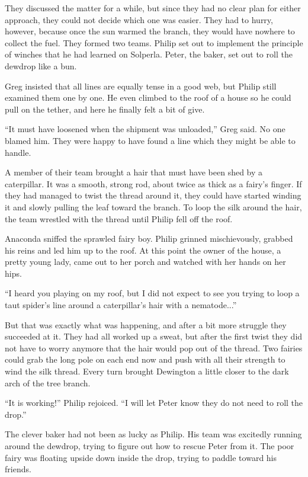 \documentclass[10pt, draft]{memoir}
\begin{document}
They discussed the matter for a while, but since they had no clear plan for either approach, they could not decide which one was easier. They had to hurry, however, because once the sun warmed the branch, they would have nowhere to collect the fuel. They formed two teams. Philip set out to implement the principle of winches that he had learned on Solperla. Peter, the baker, set out to roll the dewdrop like a bun.

Greg insisted that all lines are equally tense in a good web, but Philip still examined them one by one. He even climbed to the roof of a house so he could pull on the tether, and here he finally felt a bit of give.

``It must have loosened when the shipment was unloaded,'' Greg said. No one blamed him. They were happy to have found a line which they might be able to handle.

A member of their team brought a hair that must have been shed by a caterpillar. It was a smooth, strong rod, about twice as thick as a fairy's finger. If they had managed to twist the thread around it, they could have started winding it and slowly pulling the leaf toward the branch. To loop the silk around the hair, the team wrestled with the thread until Philip fell off the roof.

Anaconda sniffed the sprawled fairy boy. Philip grinned mischievously, grabbed his reins and led him up to the roof. At this point the owner of the house, a pretty young lady, came out to her porch and watched with her hands on her hips.

``I heard you playing on my roof, but I did not expect to see you trying to loop a taut spider's line around a caterpillar's hair with a nematode...''

But that was exactly what was happening, and after a bit more struggle they succeeded at it. They had all worked up a sweat, but after the first twist they did not have to worry anymore that the hair would pop out of the thread. Two fairies could grab the long pole on each end now and push with all their strength to wind the silk thread. Every turn brought Dewington a little closer to the dark arch of the tree branch.

``It is working!'' Philip rejoiced. ``I will let Peter know they do not need to roll the drop.''

The clever baker had not been as lucky as Philip. His team was excitedly running around the dewdrop, trying to figure out how to rescue Peter from it. The poor fairy was floating upside down inside the drop, trying to paddle toward his friends.
\end{document}
